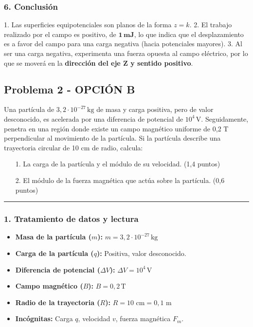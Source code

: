 \subsubsection*{6. Conclusión}
\begin{cajaconclusion}
    1. Las superficies equipotenciales son planos de la forma $z=k$.
    2. El trabajo realizado por el campo es positivo, de $\mathbf{1 \, mJ}$, lo que indica que el desplazamiento es a favor del campo para una carga negativa (hacia potenciales mayores).
    3. Al ser una carga negativa, experimenta una fuerza opuesta al campo eléctrico, por lo que se moverá en la \textbf{dirección del eje Z y sentido positivo}.
\end{cajaconclusion}

\newpage

\subsection{Problema 2 - OPCIÓN B}
\label{subsec:4B_2005_sep_cv}

\begin{cajaenunciado}
Una partícula de $3,2\cdot10^{-27}\,\text{kg}$ de masa y carga positiva, pero de valor desconocido, es acelerada por una diferencia de potencial de $10^4\,\text{V}$. Seguidamente, penetra en una región donde existe un campo magnético uniforme de 0,2 T perpendicular al movimiento de la partícula. Si la partícula describe una trayectoria circular de 10 cm de radio, calcula:
\begin{enumerate}
    \item[1.] La carga de la partícula y el módulo de su velocidad. (1,4 puntos)
    \item[2.] El módulo de la fuerza magnética que actúa sobre la partícula. (0,6 puntos)
\end{enumerate}
\end{cajaenunciado}
\hrule

\subsubsection*{1. Tratamiento de datos y lectura}
\begin{itemize}
    \item \textbf{Masa de la partícula ($m$):} $m = 3,2\cdot10^{-27} \, \text{kg}$
    \item \textbf{Carga de la partícula ($q$):} Positiva, valor desconocido.
    \item \textbf{Diferencia de potencial ($\Delta V$):} $\Delta V = 10^4 \, \text{V}$
    \item \textbf{Campo magnético ($B$):} $B = 0,2 \, \text{T}$
    \item \textbf{Radio de la trayectoria ($R$):} $R = 10 \text{ cm} = 0,1$ m
    \item \textbf{Incógnitas:} Carga $q$, velocidad $v$, fuerza magnética $F_m$.
\end{itemize}

